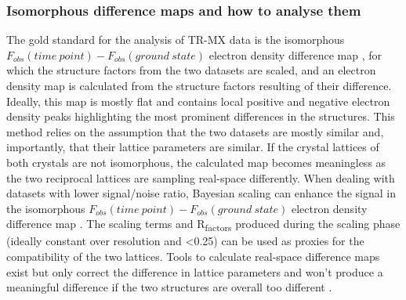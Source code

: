 \subsubsection{Isomorphous difference maps and how to analyse them}

The gold standard for the analysis of TR-MX data is the isomorphous \(F_{obs}(time\ point)- F_{obs}(ground\ state)\) electron density difference map \parencite{rouldIsomorphousDifferenceMethods2003}, for which the structure factors from the two datasets are scaled, and an electron density map is calculated from the structure factors resulting of their difference. Ideally, this map is mostly flat and contains local positive and negative electron density peaks highlighting the most prominent differences in the structures. This method relies on the assumption that the two datasets are mostly similar and, importantly, that their lattice parameters are similar. If the crystal lattices of both crystals are not isomorphous, the calculated map becomes meaningless as the two reciprocal lattices are sampling real-space differently. When dealing with datasets with lower signal/noise ratio, Bayesian scaling can enhance the signal in the isomorphous \(F_{obs}(time\ point)- F_{obs}(ground\ state)\) electron density difference map \parencite{ursbyImprovedEstimationStructureFactor1997}. The scaling terms and R\textsubscript{factors} produced during the scaling phase (ideally constant over resolution and <0.25) can be used as proxies for the compatibility of the two lattices. Tools to calculate real-space difference maps exist but only correct the difference in lattice parameters and won't produce a meaningful difference if the two structures are overall too different \parencite{brooknerMatchMapsNonisomorphousDifference2024}.

